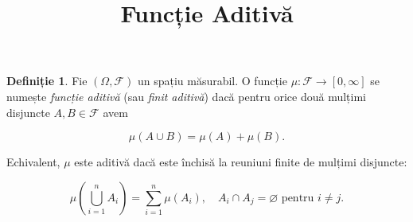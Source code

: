 \documentclass[12pt]{article}
\title{Funcție Aditivă}
\author{}
\date{}
\theoremstyle{definition}
\newtheorem{definition}{Definiție}
\begin{document}
\maketitle

\begin{definition}
Fie $(\Omega, \mathcal{F})$ un spațiu măsurabil. 
O funcție $\mu : \mathcal{F} \to [0, \infty]$ se numește \emph{funcție aditivă} (sau \emph{finit aditivă}) dacă pentru orice două mulțimi disjuncte $A, B \in \mathcal{F}$ avem


\[
    \mu(A \cup B) = \mu(A) + \mu(B).
\]


\end{definition}

\noindent
Echivalent, $\mu$ este aditivă dacă este închisă la reuniuni finite de mulțimi disjuncte:


\[
    \mu\!\left(\bigcup_{i=1}^n A_i\right)
    = \sum_{i=1}^n \mu(A_i),
    \quad A_i \cap A_j = \varnothing \text{ pentru } i \neq j.
\]
\end{document}
